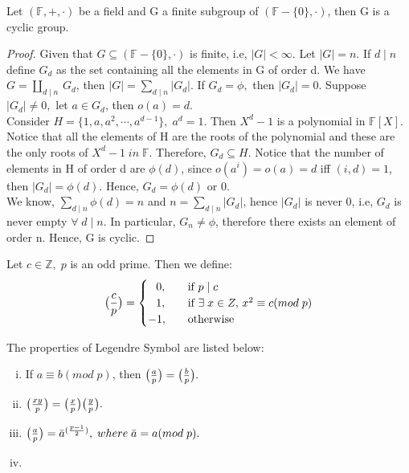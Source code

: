\documentclass[10pt,a4paper]{article}
\begin{document}
\begin{theorem}
Let $(\mathbb{F},+,\cdot)$ be a field and G a finite subgroup of $(\mathbb{F}-\{0\},\cdot)$, then G is a cyclic group.
\end{theorem}

\begin{proof}
Given that $G\subseteq (\mathbb{F}-\{0\},\cdot)$ is finite, i.e, $|G|<\infty$. Let $|G|=n.$ If $d\mid n$ define $G_d$ as the set containing all the elements in G of order d. We have $G=\coprod_{d\mid n}\,G_d$, then $|G|=\sum_{d\mid n}|G_d|$. If $G_d=\phi,$ then $|G_d|=0.$ Suppose $|G_d|\neq0,$ let $a\in G_d$, then $o(a)=d$. \\
Consider $H=\{1,a,a^2,\cdots,a^{d-1}\},\;a^d=1$. Then $X^d-1$ is a polynomial in $\mathbb{F}[X]$. Notice that all the elements of H are the roots of the polynomial and these are the only roots of $X^d-1\;in\;\mathbb{F}.$ Therefore, $G_d\subseteq H$. Notice that the number of elements in H of order d are $\phi(d)$, since $o(a^i)=o(a)=d$ iff $(i,d)=1$, then $|G_d|=\phi(d).$ Hence, $G_d = \phi(d)$ or $0$. \\
We know, $\sum_{d\mid n}\phi(d)=n$ and $n=\sum_{d\mid n}|G_d|$, hence $|G_d|$ is never 0, i.e, $G_d$ is never empty $\forall\;d\mid n$. In particular, $G_n\neq \phi$, therefore there exists an element of order n. Hence, G is cyclic.
\end{proof}

\begin{mydef}
Let $c\in\mathbb{Z},\;p$ is an odd prime. Then we define:
\[   
\big(\frac{c}{p}\big) = 
     \begin{cases}	
       \;\;\,0, &\quad\text{if }p\mid c\\
       \;\;\,1, &\quad\text{if }\exists\;x\in{Z},\,x^2\equiv c(mod\;p) \\
      -1, &\quad\text{otherwise}\\ 
     \end{cases}
\]
\end{mydef}

\newcommand{\modp}[2]{#1(mod\;#2)}

\begin{theorem}
The properties of Legendre Symbol are listed below:
\begin{enumerate}[i)]
\item If $a\equiv \modp{b}{p}$, then $\big(\frac{a}{p}\big)=\big(\frac{b}{p}\big).$
\item $\big(\frac{xy}{p}\big)=\big(\frac{x}{p}\big)\big(\frac{y}{p}\big).$
\item $\leg{a}{p}={\bar{a}}^{(\frac{p-1}{2})},\;where\;\bar{a}=\modp{a}{p}.$
\item 
\end{enumerate}
\end{theorem}
\end{document}
